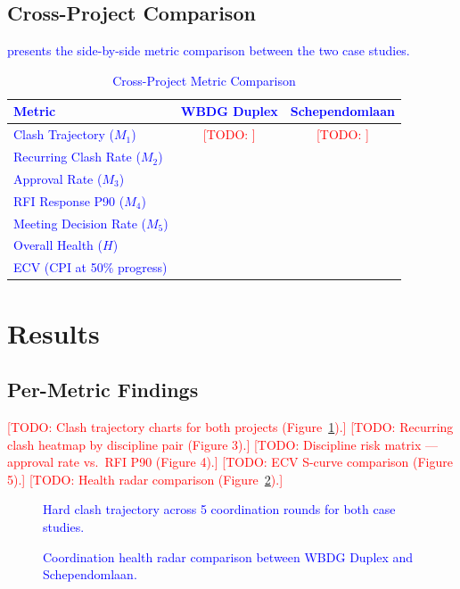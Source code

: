 \documentclass[conference]{IEEEtran}
\newcommand{\todo}[1]{\textcolor{red}{[TODO: #1]}}
\newcommand{\placeholder}[1]{\textcolor{blue}{#1}}
\begin{document}
\subsection{Cross-Project Comparison}
\placeholder{
 presents the side-by-side metric comparison between the two case studies.

\begin{table}[htbp]
    \centering
    \caption{Cross-Project Metric Comparison}
    \label{tab:comparison}
    \begin{tabular}{lcc}
        \toprule
        Metric & WBDG Duplex & Schependomlaan \\
        \midrule
        Clash Trajectory ($M_1$)       & \todo{} & \todo{} \\
        Recurring Clash Rate ($M_2$)   & & \\
        Approval Rate ($M_3$)          & & \\
        RFI Response P90 ($M_4$)       & & \\
        Meeting Decision Rate ($M_5$)  & & \\
        \midrule
        Overall Health ($H$)           & & \\
        ECV (CPI at 50\% progress)     & & \\
        \bottomrule
    \end{tabular}
\end{table}
}

\section{Results}

\subsection{Per-Metric Findings}
\placeholder{
\todo{Clash trajectory charts for both projects (Figure~\ref{fig:trajectory}).}
\todo{Recurring clash heatmap by discipline pair (Figure 3).}
\todo{Discipline risk matrix --- approval rate vs.\ RFI P90 (Figure 4).}
\todo{ECV S-curve comparison (Figure 5).}
\todo{Health radar comparison (Figure~\ref{fig:radar}).}

\begin{figure}[htbp]
    \centering
    \fbox{\rule{0pt}{4cm}\rule{\columnwidth}{0pt}}
    \caption{Hard clash trajectory across 5 coordination rounds for both case studies.}
    \label{fig:trajectory}
\end{figure}

\begin{figure}[htbp]
    \centering
    \fbox{\rule{0pt}{4cm}\rule{\columnwidth}{0pt}}
    \caption{Coordination health radar comparison between WBDG Duplex and Schependomlaan.}
    \label{fig:radar}
\end{figure}
}
\end{document}
